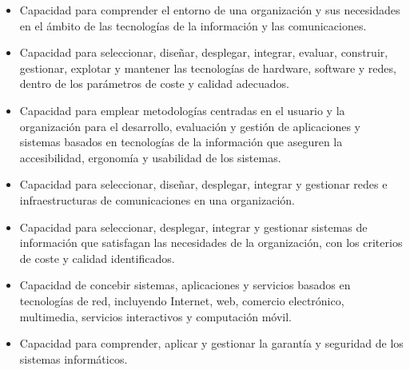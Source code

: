 \documentclass{pre-tfg}
\begin{document}
\begin{itemize}
\item Capacidad para comprender el entorno de una organización y sus necesidades en el
  ámbito de las tecnologías de la información y las comunicaciones.
\item Capacidad para seleccionar, diseñar, desplegar, integrar, evaluar, construir,
  gestionar, explotar y mantener las tecnologías de hardware, software y redes, dentro de
  los parámetros de coste y calidad adecuados.
\item Capacidad para emplear metodologías centradas en el usuario y la organización para
  el desarrollo, evaluación y gestión de aplicaciones y sistemas basados en tecnologías de
  la información que aseguren la accesibilidad, ergonomía y usabilidad de los sistemas.
\item Capacidad para seleccionar, diseñar, desplegar, integrar y gestionar redes e
  infraestructuras de comunicaciones en una organización.
\item Capacidad para seleccionar, desplegar, integrar y gestionar sistemas de información
  que satisfagan las necesidades de la organización, con los criterios de coste y calidad
  identificados.
\item Capacidad de concebir sistemas, aplicaciones y servicios basados en tecnologías de
  red, incluyendo Internet, web, comercio electrónico, multimedia, servicios interactivos
  y computación móvil.
\item Capacidad para comprender, aplicar y gestionar la garantía y seguridad de los sistemas informáticos.
\end{itemize}
\end{document}
